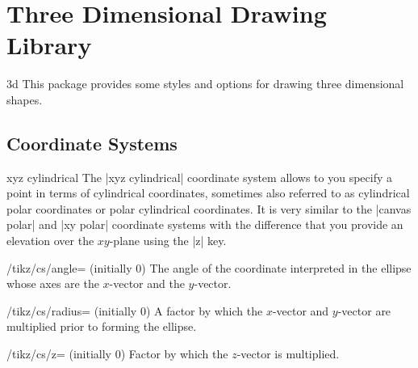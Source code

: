 %
%
%


\section[library-3d]{Three Dimensional Drawing Library}

\begin{tikzlibrary}{3d}
    This package provides some styles and options for drawing three dimensional
    shapes.
\end{tikzlibrary}


\subsection{Coordinate Systems}

\begin{coordinatesystem}{xyz cylindrical}
    The |xyz cylindrical| coordinate system allows to you specify a point in
    terms of cylindrical coordinates, sometimes also referred to as cylindrical
    polar coordinates or polar cylindrical coordinates. It is very similar to
    the |canvas polar| and |xy polar| coordinate systems with the difference
    that you provide an elevation over the $xy$-plane using the |z| key.
    \begin{key}{/tikz/cs/angle= (initially 0)}
        The angle of the coordinate interpreted in the ellipse whose axes are
        the $x$-vector and the $y$-vector.
    \end{key}
    \begin{key}{/tikz/cs/radius= (initially 0)}
        A factor by which the $x$-vector and $y$-vector are multiplied prior to
        forming the ellipse.
    \end{key}
    \begin{key}{/tikz/cs/z= (initially 0)}
        Factor by which the $z$-vector is multiplied.
    \end{key}
\begin{codeexample}[preamble={\usetikzlibrary{3d}}]
\end{codeexample}
\end{coordinatesystem}

